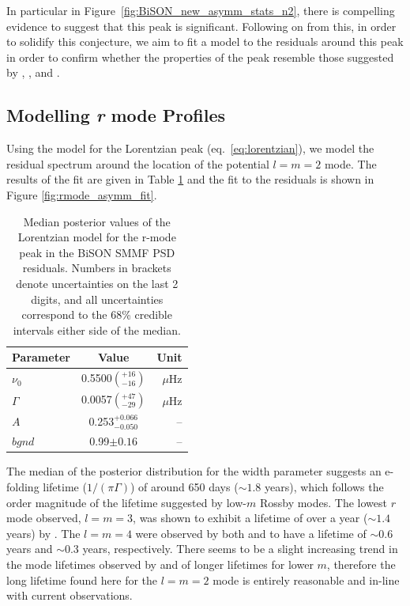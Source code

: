 In particular in Figure~\ref{fig:BiSON_new_asymm_stats_n2}, there is compelling evidence to suggest that this peak is significant. Following on from this, in order to solidify this conjecture, we aim to fit a model to the residuals around this peak in order to confirm whether the properties of the peak resemble those suggested by \citet{loptien_global-scale_2018}, \citet{liang_time-distance_2019}, and \citet{lanza_sectoral_2019}.


\subsection{Modelling {\it r} mode Profiles}

Using the model for the Lorentzian peak (eq.~\ref{eq:lorentzian}), we model the residual spectrum around the location of the potential  $l=m=2$ mode. The results of the fit are given in Table \ref{tab:rmode_fit_params} and the fit to the residuals is shown in Figure \ref{fig:rmode_asymm_fit}.

\begin{table}
	\begin{center}
		\caption{Median posterior values of the Lorentzian model for the r-mode peak in the BiSON SMMF PSD residuals. Numbers in brackets denote uncertainties on the last 2 digits, and all uncertainties correspond to the 68\% credible intervals either side of the median.}
		\label{tab:rmode_fit_params}
		\begin{tabular}{l c r}
			\hline
			{Parameter} & {Value} & {Unit} \\
			\hline
			
			{$\nu_0$} & {0.5500$\left(_{-16}^{+16}\right)$} & {$\mu\mathrm{Hz} $}\\
			
			{$\Gamma$} & {0.0057$\left(_{-29}^{+47}\right)$} & {$\mu\mathrm{Hz} $} \\
			
			{$A$} & {0.253$_{-0.050}^{+0.066}$} & {--} \\
			
			
			{$bgnd$} & {0.99$\pm 0.16$} & {--} \\	
			
			\hline
		\end{tabular}
	\end{center}
\end{table}

The median of the posterior distribution for the width parameter suggests an e-folding lifetime ($1/(\pi \Gamma)$) of around 650 days ($\sim 1.8$ years), which follows the order magnitude of the lifetime suggested by low-$m$ Rossby modes. The lowest $r$ mode observed, $l=m=3$, was shown to exhibit a lifetime of over a year ($\sim 1.4$ years) by \citet{liang_time-distance_2019}. The $l=m=4$ were observed by both \citet{loptien_global-scale_2018} and \citet{liang_time-distance_2019} to have a lifetime of $\sim 0.6$ years and $\sim 0.3$ years, respectively. There seems to be a slight increasing trend in the mode lifetimes observed by \citet{loptien_global-scale_2018} and \citet{liang_time-distance_2019} of longer lifetimes for lower $m$, therefore the long lifetime found here for the $l=m=2$ mode is entirely reasonable and in-line with current observations.

